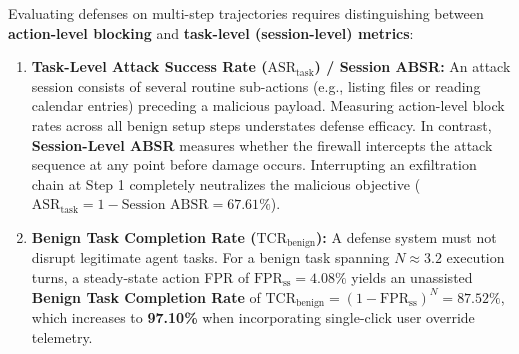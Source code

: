 \documentclass[conference]{IEEEtran}
\begin{document}
Evaluating defenses on multi-step trajectories requires distinguishing between \textbf{action-level blocking} and \textbf{task-level (session-level) metrics}:
\begin{enumerate}
    \item \textbf{Task-Level Attack Success Rate ($\text{ASR}_{\text{task}}$) / Session ABSR:} An attack session consists of several routine sub-actions (e.g., listing files or reading calendar entries) preceding a malicious payload. Measuring action-level block rates across all benign setup steps understates defense efficacy. In contrast, \textbf{Session-Level ABSR} measures whether the firewall intercepts the attack sequence at any point before damage occurs. Interrupting an exfiltration chain at Step 1 completely neutralizes the malicious objective ($\text{ASR}_{\text{task}} = 1 - \text{Session ABSR} = 67.61\%$).
    \item \textbf{Benign Task Completion Rate ($\text{TCR}_{\text{benign}}$):} A defense system must not disrupt legitimate agent tasks. For a benign task spanning $N \approx 3.2$ execution turns, a steady-state action FPR of $\text{FPR}_{\text{ss}} = 4.08\%$ yields an unassisted \textbf{Benign Task Completion Rate} of $\text{TCR}_{\text{benign}} = (1 - \text{FPR}_{\text{ss}})^N = 87.52\%$, which increases to \textbf{97.10\%} when incorporating single-click user override telemetry.
\end{enumerate}
\end{document}
